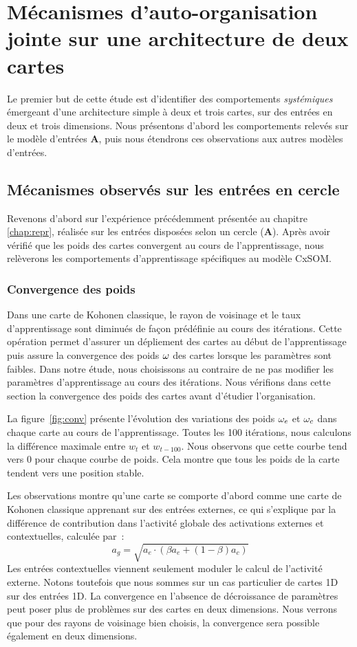 \documentclass[../main]{subfiles}
\begin{document}
\section{Mécanismes d'auto-organisation jointe sur une architecture de deux cartes}

Le premier but de cette étude est d'identifier des comportements \emph{systémiques} émergeant d'une architecture simple à deux et trois cartes, sur des entrées en deux et trois dimensions. Nous présentons d'abord les comportements relevés sur le modèle d'entrées \textbf{A}, puis nous étendrons ces observations aux autres modèles d'entrées.

\subsection{Mécanismes observés sur les entrées en cercle}

Revenons d'abord sur l'expérience précédemment présentée au chapitre \ref{chap:repr}, réalisée sur les entrées disposées selon un cercle (\textbf{A}).
Après avoir vérifié que les poids des cartes convergent au cours de l'apprentissage, nous relèverons les comportements d'apprentissage spécifiques au modèle CxSOM.

\subsubsection{Convergence des poids}

Dans une carte de Kohonen classique, le rayon de voisinage et le taux d'apprentissage sont diminués de façon prédéfinie au cours des itérations. 
Cette opération permet d'assurer un dépliement des cartes au début de l'apprentissage puis assure la convergence des poids $\omega$ des cartes lorsque les paramètres sont faibles.
Dans notre étude, nous choisissons au contraire de ne pas modifier les paramètres d'apprentissage au cours des itérations.
Nous vérifions dans cette section la convergence des poids des cartes avant d'étudier l'organisation. 

La figure~\ref{fig:conv} présente l'évolution des variations des poids $\omega_{e}$ et $\omega_{c}$ dans chaque carte au cours de l'apprentissage. Toutes les 100 itérations, nous calculons la différence maximale entre $w_t$ et $w_{t-100}$.
Nous observons que cette courbe tend vers $0$ pour chaque courbe de poids. Cela montre que tous les poids de la carte tendent vers une position stable.

Les observations montre qu'une carte se comporte d'abord comme une carte de Kohonen classique apprenant sur des entrées externes, ce qui s'explique par la différence de contribution dans l'activité globale des activations externes et contextuelles, calculée par~: 
$$ a_g = \sqrt{a_e \cdot (\beta a_e + (1-\beta)a_c)}$$
Les entrées contextuelles viennent seulement moduler le calcul de l'activité externe.
Notons toutefois que nous sommes sur un cas particulier de cartes 1D sur des entrées 1D.
La convergence en l'absence de décroissance de paramètres peut poser plus de problèmes sur des cartes en deux dimensions. 
Nous verrons que pour des rayons de voisinage bien choisis, la convergence sera possible également en deux dimensions.
\end{document}
